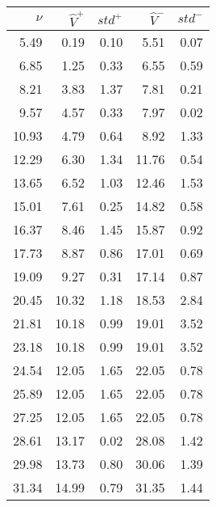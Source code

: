 \documentclass{article}
\begin{document}
\begin{tabular}{rrrrr}\hline 
$\nu$  & $\widehat{V}^{+}$ & $std^{+}$ & $\widehat{V}^{-}$ & $std^{-}$ \\\hline 
    5.49 &     0.19 &     0.10 &     5.51  &     0.07 \\ 
    6.85 &     1.25 &     0.33 &     6.55  &     0.59 \\ 
    8.21 &     3.83 &     1.37 &     7.81  &     0.21 \\ 
    9.57 &     4.57 &     0.33 &     7.97  &     0.02 \\ 
   10.93 &     4.79 &     0.64 &     8.92  &     1.33 \\ 
   12.29 &     6.30 &     1.34 &    11.76  &     0.54 \\ 
   13.65 &     6.52 &     1.03 &    12.46  &     1.53 \\ 
   15.01 &     7.61 &     0.25 &    14.82  &     0.58 \\ 
   16.37 &     8.46 &     1.45 &    15.87  &     0.92 \\ 
   17.73 &     8.87 &     0.86 &    17.01  &     0.69 \\ 
   19.09 &     9.27 &     0.31 &    17.14  &     0.87 \\ 
   20.45 &    10.32 &     1.18 &    18.53  &     2.84 \\ 
   21.81 &    10.18 &     0.99 &    19.01  &     3.52 \\ 
   23.18 &    10.18 &     0.99 &    19.01  &     3.52 \\ 
   24.54 &    12.05 &     1.65 &    22.05  &     0.78 \\ 
   25.89 &    12.05 &     1.65 &    22.05  &     0.78 \\ 
   27.25 &    12.05 &     1.65 &    22.05  &     0.78 \\ 
   28.61 &    13.17 &     0.02 &    28.08  &     1.42 \\ 
   29.98 &    13.73 &     0.80 &    30.06  &     1.39 \\ 
   31.34 &    14.99 &     0.79 &    31.35  &     1.44 \\ \hline 
\end{tabular}
\end{document}
